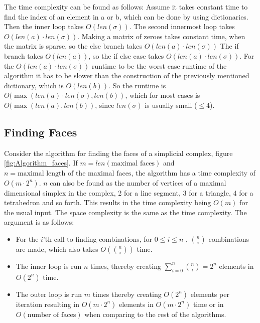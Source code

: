 \documentclass[11pt,a4paper,twoside]{report}
\begin{document}
The time complexity can be found as follows:
Assume it takes constant time to find the index of an element in a or b, which can be done by using dictionaries. Then the inner loop takes $O(len(\sigma))$.
The second innermost loop takes $O(len(a)\cdot len(\sigma))$.
Making a matrix of zeroes takes constant time, when the matrix is sparse, so the else branch takes $O(len(a)\cdot len(\sigma))$
The if branch takes $O(len(a))$, so the if else case takes $O(len(a)\cdot len(\sigma))$. 
For the $O(len(a)\cdot len(\sigma))$ runtime to be the worst case runtime of the algorithm it has to be slower than the construction of the previously mentioned dictionary, which is $O(len(b))$.
So the runtime is $O(\max(len(a)\cdot len(\sigma),len(b))$, which for most cases is $O(\max(len(a),len(b))$, since $len(\sigma)$ is usually small ($\leq 4$).
 

\subsection{Finding Faces}
Consider the algorithm for finding the faces of a simplicial complex, figure \ref{fig:Algorithm_faces}. If $m = len(\text{maximal faces})$ and $n = \text{maximal length of the maximal faces}$, the algorithm has a time complexity of $O(m\cdot 2^n)$. $n$ can also be found as the number of vertices of a maximal dimensional simplex in the complex, 2 for a line segment, 3 for a triangle, 4 for a tetrahedron and so forth. This results in the time complexity being $O(m)$ for the usual input. The space complexity is the same as the time complexity. The argument is as follows:
\begin{itemize}
\item For the $i$'th call to finding combinations, for $0\leq i\leq n$ , $\binom{n}{i}$ combinations are made, which also takes $O(\binom{n}{i})$ time.
\item The inner loop is run $n$ times, thereby creating $\sum_{i=0}^n\binom{n}{i}=2^n$  elements in $O(2^n)$ time.
\item The outer loop is run $m$ times thereby creating $O(2^n)$ elements per iteration resulting in $O(m\cdot 2^n)$ elements in $O(m\cdot 2^n)$ time or in $O(\text{number of faces})$ when comparing to the rest of the algorithms.
\end{itemize}
\end{document}
